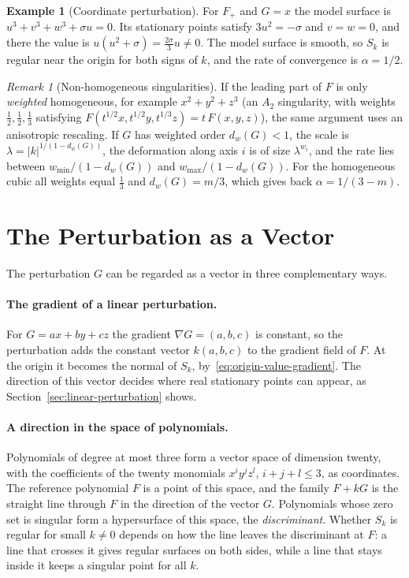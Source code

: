 \documentclass[12pt, a4paper, oneside]{book}
\theoremstyle{plain}
\theoremstyle{definition}
\newtheorem{example}[theorem]{Example}
\theoremstyle{remark}
\newtheorem{remark}[theorem]{Remark}
\begin{document}
\begin{example}[Coordinate perturbation]
For $F_+$ and $G=x$ the model surface is $u^3+v^3+w^3+\sigma u=0$. Its
stationary points satisfy $3u^2=-\sigma$ and $v=w=0$, and there the value is
$u(u^2+\sigma)=\tfrac{2\sigma}{3}u\neq0$. The model surface is smooth, so $S_k$
is regular near the origin for both signs of $k$, and the rate of convergence
is $\alpha=1/2$.
\end{example}

\begin{remark}[Non-homogeneous singularities]
\label{rem:weighted}
If the leading part of $F$ is only \emph{weighted} homogeneous, for example
$x^2+y^2+z^3$ (an $A_2$ singularity, with weights $\tfrac12,\tfrac12,\tfrac13$
satisfying $F(t^{1/2}x,t^{1/2}y,t^{1/3}z)=t\,F(x,y,z)$), the same argument uses
an anisotropic rescaling. If $G$ has weighted order $d_w(G)<1$, the scale is
$\lambda=|k|^{1/(1-d_w(G))}$, the deformation along axis $i$ is of size
$\lambda^{w_i}$, and the rate lies between
$w_{\min}/(1-d_w(G))$ and $w_{\max}/(1-d_w(G))$. For the homogeneous cubic all
weights equal $\tfrac13$ and $d_w(G)=m/3$, which gives back
$\alpha=1/(3-m)$.
\end{remark}

\section{The Perturbation as a Vector}
\label{sec:perturbation-vector}

The perturbation $G$ can be regarded as a vector in three complementary ways.

\paragraph{The gradient of a linear perturbation.}
For $G=ax+by+cz$ the gradient $\nabla G=(a,b,c)$ is constant, so the
perturbation adds the constant vector $k(a,b,c)$ to the gradient field of $F$.
At the origin it becomes the normal of $S_k$, by~\eqref{eq:origin-value-gradient}.
The direction of this vector decides where real stationary points can appear,
as Section~\ref{sec:linear-perturbation} shows.

\paragraph{A direction in the space of polynomials.}
Polynomials of degree at most three form a vector space of dimension twenty,
with the coefficients of the twenty monomials $x^iy^jz^l$, $i+j+l\le3$, as
coordinates. The reference polynomial $F$ is a point of this space, and the
family $F+kG$ is the straight line through $F$ in the direction of the vector
$G$. Polynomials whose zero set is singular form a hypersurface of this space,
the \emph{discriminant}. Whether $S_k$ is regular for small $k\neq0$ depends
on how the line leaves the discriminant at $F$: a line that crosses it gives
regular surfaces on both sides, while a line that stays inside it keeps a
singular point for all $k$.
\end{document}
